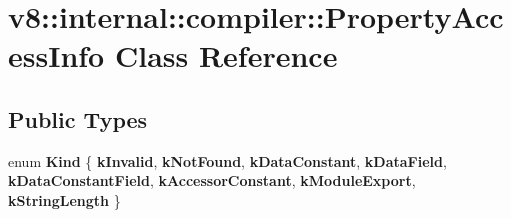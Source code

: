 \hypertarget{classv8_1_1internal_1_1compiler_1_1PropertyAccessInfo}{}\section{v8\+:\+:internal\+:\+:compiler\+:\+:Property\+Access\+Info Class Reference}
\label{classv8_1_1internal_1_1compiler_1_1PropertyAccessInfo}
\subsection*{Public Types}
\begin{DoxyCompactItemize}
\item 
\mbox{\label{classv8_1_1internal_1_1compiler_1_1PropertyAccessInfo_a2804d5e273b0aa143cd0b33ead05fd3e}} 
enum {\bfseries Kind} \{ \newline
{\bfseries k\+Invalid}, 
{\bfseries k\+Not\+Found}, 
{\bfseries k\+Data\+Constant}, 
{\bfseries k\+Data\+Field}, 
\newline
{\bfseries k\+Data\+Constant\+Field}, 
{\bfseries k\+Accessor\+Constant}, 
{\bfseries k\+Module\+Export}, 
{\bfseries k\+String\+Length}
 \}
\end{DoxyCompactItemize}
